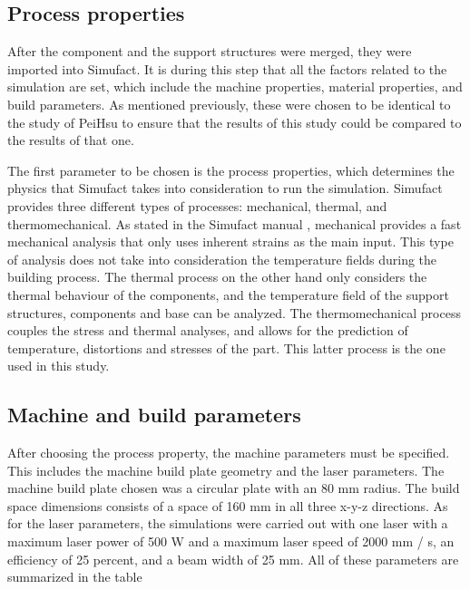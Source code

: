 \documentclass[../main.tex]{subfiles}
\begin{document}
\subsection{Process properties}


After the component and the support structures were merged, they were imported into Simufact. It is during this step that all the factors related to the simulation are set, which include the machine properties, material properties, and build parameters. As mentioned previously, these were chosen to be identical to the study of PeiHsu to ensure that the results of this study could be compared to the results of that one. 

The first parameter to be chosen is the process properties, which determines the physics that Simufact takes into consideration to run the simulation. Simufact provides three different types of processes: mechanical, thermal, and thermomechanical. As stated in the Simufact manual , mechanical provides a fast mechanical analysis that only uses inherent strains as the main input. This type of analysis does not take into consideration the temperature fields during the building process. The thermal process on the other hand only considers the thermal behaviour of the components, and the temperature field of the support structures, components and base can be analyzed. The thermomechanical process couples the stress and thermal analyses, and allows for the prediction of temperature, distortions and stresses of the part. This latter process is the one used in this study.

\subsection{Machine and build parameters}


After choosing the process property, the machine parameters must be specified. This includes the machine build plate geometry and the laser parameters. The machine build plate chosen was a circular plate with an 80 mm radius. The build space dimensions consists of a space of 160 mm in all three x-y-z directions. As for the laser parameters, the simulations were carried out with one laser with a maximum laser power of 500 W and a maximum laser speed of 2000 mm / s, an efficiency of 25 percent, and a beam width of 25 mm. All of these parameters are summarized in the table 
\end{document}
